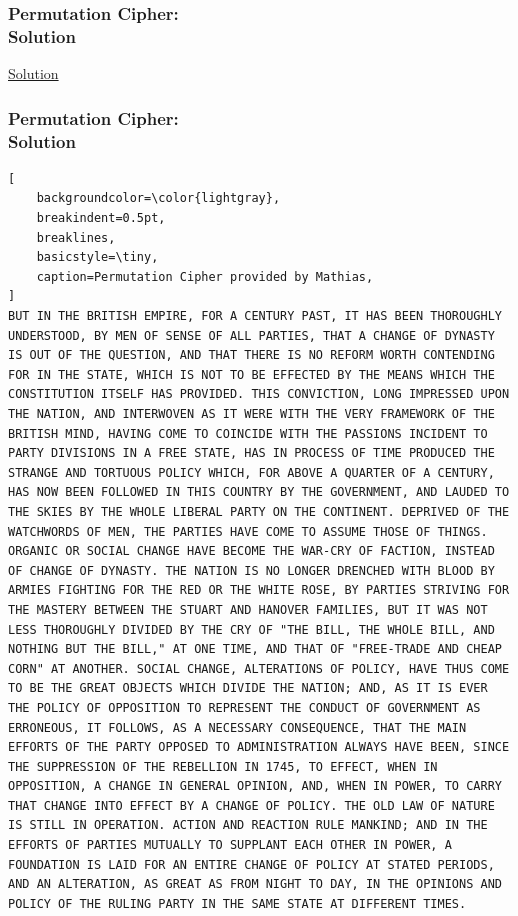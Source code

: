\documentclass{uva-inf-presentation}
\begin{document}
\begin{frame}
\frametitle{Permutation Cipher:\\ Solution}
\href{http://tholman.com/other/transposition/}{Solution}
\end{frame}

\begin{frame}[containsverbatim]
\frametitle{Permutation Cipher:\\ Solution}
\vspace{-20pt}
\begin{lstlisting}[
    backgroundcolor=\color{lightgray},
    breakindent=0.5pt,
    breaklines,
    basicstyle=\tiny,
    caption=Permutation Cipher provided by Mathias,
]
BUT IN THE BRITISH EMPIRE, FOR A CENTURY PAST, IT HAS BEEN THOROUGHLY UNDERSTOOD, BY MEN OF SENSE OF ALL PARTIES, THAT A CHANGE OF DYNASTY IS OUT OF THE QUESTION, AND THAT THERE IS NO REFORM WORTH CONTENDING FOR IN THE STATE, WHICH IS NOT TO BE EFFECTED BY THE MEANS WHICH THE CONSTITUTION ITSELF HAS PROVIDED. THIS CONVICTION, LONG IMPRESSED UPON THE NATION, AND INTERWOVEN AS IT WERE WITH THE VERY FRAMEWORK OF THE BRITISH MIND, HAVING COME TO COINCIDE WITH THE PASSIONS INCIDENT TO PARTY DIVISIONS IN A FREE STATE, HAS IN PROCESS OF TIME PRODUCED THE STRANGE AND TORTUOUS POLICY WHICH, FOR ABOVE A QUARTER OF A CENTURY, HAS NOW BEEN FOLLOWED IN THIS COUNTRY BY THE GOVERNMENT, AND LAUDED TO THE SKIES BY THE WHOLE LIBERAL PARTY ON THE CONTINENT. DEPRIVED OF THE WATCHWORDS OF MEN, THE PARTIES HAVE COME TO ASSUME THOSE OF THINGS. ORGANIC OR SOCIAL CHANGE HAVE BECOME THE WAR-CRY OF FACTION, INSTEAD OF CHANGE OF DYNASTY. THE NATION IS NO LONGER DRENCHED WITH BLOOD BY ARMIES FIGHTING FOR THE RED OR THE WHITE ROSE, BY PARTIES STRIVING FOR THE MASTERY BETWEEN THE STUART AND HANOVER FAMILIES, BUT IT WAS NOT LESS THOROUGHLY DIVIDED BY THE CRY OF "THE BILL, THE WHOLE BILL, AND NOTHING BUT THE BILL," AT ONE TIME, AND THAT OF "FREE-TRADE AND CHEAP CORN" AT ANOTHER. SOCIAL CHANGE, ALTERATIONS OF POLICY, HAVE THUS COME TO BE THE GREAT OBJECTS WHICH DIVIDE THE NATION; AND, AS IT IS EVER THE POLICY OF OPPOSITION TO REPRESENT THE CONDUCT OF GOVERNMENT AS ERRONEOUS, IT FOLLOWS, AS A NECESSARY CONSEQUENCE, THAT THE MAIN EFFORTS OF THE PARTY OPPOSED TO ADMINISTRATION ALWAYS HAVE BEEN, SINCE THE SUPPRESSION OF THE REBELLION IN 1745, TO EFFECT, WHEN IN OPPOSITION, A CHANGE IN GENERAL OPINION, AND, WHEN IN POWER, TO CARRY THAT CHANGE INTO EFFECT BY A CHANGE OF POLICY. THE OLD LAW OF NATURE IS STILL IN OPERATION. ACTION AND REACTION RULE MANKIND; AND IN THE EFFORTS OF PARTIES MUTUALLY TO SUPPLANT EACH OTHER IN POWER, A FOUNDATION IS LAID FOR AN ENTIRE CHANGE OF POLICY AT STATED PERIODS, AND AN ALTERATION, AS GREAT AS FROM NIGHT TO DAY, IN THE OPINIONS AND POLICY OF THE RULING PARTY IN THE SAME STATE AT DIFFERENT TIMES.
\end{lstlisting}
\end{frame}
\end{document}
